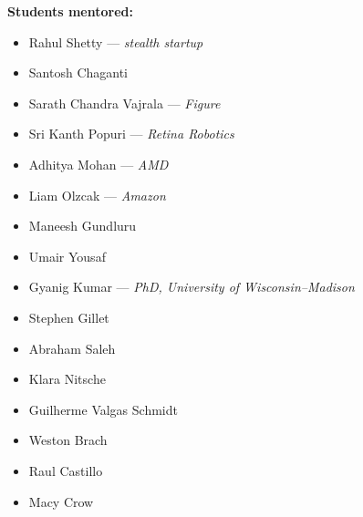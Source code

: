 \noindent\textbf{Students mentored:}\\[4pt]
\begin{minipage}[t]{0.5\linewidth}
  \begin{itemize}[noitemsep, topsep=0pt, partopsep=0pt, parsep=0pt, leftmargin=2ex]
    \item Rahul Shetty --- \textit{stealth startup}
    \item Santosh Chaganti
    \item Sarath Chandra Vajrala --- \textit{Figure}
    \item Sri Kanth Popuri --- \textit{Retina Robotics}
    \item Adhitya Mohan --- \textit{AMD}
    \item Liam Olzcak --- \textit{Amazon}
    \item Maneesh Gundluru
    \item Umair Yousaf
  \end{itemize}
\end{minipage}%
\begin{minipage}[t]{0.5\linewidth}
  \begin{itemize}[noitemsep, topsep=0pt, partopsep=0pt, parsep=0pt, leftmargin=2ex]
    \item Gyanig Kumar --- \textit{PhD, University of Wisconsin--Madison}
    \item Stephen Gillet
    \item Abraham Saleh
    \item Klara Nitsche
    \item Guilherme Valgas Schmidt
    \item Weston Brach
    \item Raul Castillo
    \item Macy Crow
  \end{itemize}
\end{minipage}
\par
